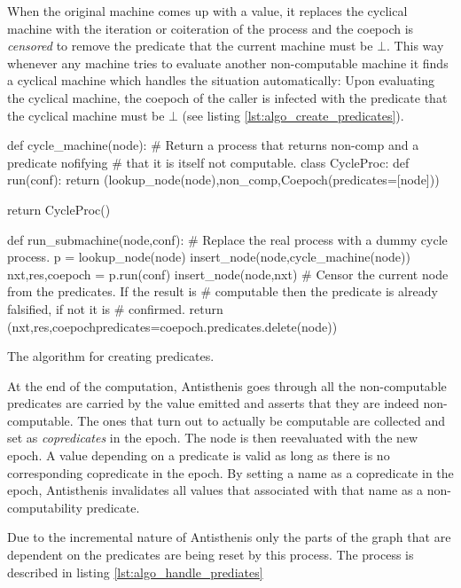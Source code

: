 When the original machine comes up with a value, it replaces the
cyclical machine with the iteration or coiteration of the process and
the coepoch is \emph{censored} to remove the predicate that the
current machine must be \(\bot\). This way whenever any machine tries
to evaluate another non-computable machine it finds a cyclical machine
which handles the situation automatically: Upon evaluating the
cyclical machine, the coepoch of the caller is infected with the
predicate that the cyclical machine must be \(\bot\) (see listing
\ref{lst:algo_create_predicates}).

\begin{code}
\begin{pycode}
def cycle_machine(node):
    # Return a process that returns non-comp and a predicate nofifying
    # that it is itself not computable.
    class CycleProc:
        def run(conf):
           return (lookup_node(node),non_comp,Coepoch(predicates=[node]))

    return CycleProc()

def run_submachine(node,conf):
    # Replace the real process with a dummy cycle process.
    p = lookup_node(node)
    insert_node(node,cycle_machine(node))
    nxt,res,coepoch = p.run(conf)
    insert_node(node,nxt)
    # Censor the current node from the predicates. If the result is
    # computable then the predicate is already falsified, if not it is
    # confirmed.
    return (nxt,res,coepoch{predicates=coepoch.predicates.delete(node)})
\end{pycode}
  \caption{\label{lst:algo_create_predicates}The algorithm for
    creating predicates.}
\end{code}

At the end of the computation, Antisthenis goes through all the
non-computable predicates are carried by the value emitted and asserts
that they are indeed non-computable. The ones that turn out to
actually be computable are collected and set as \emph{copredicates} in
the epoch. The node is then reevaluated with the new epoch. A value
depending on a predicate is valid as long as there is no corresponding
copredicate in the epoch. By setting a name as a copredicate in the
epoch, Antisthenis invalidates all values that associated with that
name as a non-computability predicate.

Due to the incremental nature of Antisthenis only the parts of the
graph that are dependent on the predicates are being reset by this
process. The process is described in listing
\ref{lst:algo_handle_prediates}

